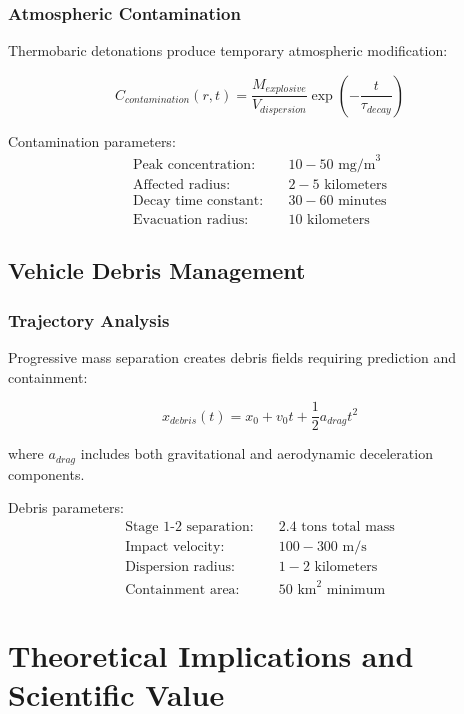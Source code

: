 \documentclass[12pt,a4paper]{article}
\begin{document}
\subsubsection{Atmospheric Contamination}
Thermobaric detonations produce temporary atmospheric modification:

\begin{equation}
C_{contamination}(r,t) = \frac{M_{explosive}}{V_{dispersion}} \exp\left(-\frac{t}{\tau_{decay}}\right)
\label{eq:contamination_decay}
\end{equation}

Contamination parameters:
\begin{align}
\text{Peak concentration:} &\quad 10-50 \text{ mg/m}^3 \\
\text{Affected radius:} &\quad 2-5 \text{ kilometers} \\
\text{Decay time constant:} &\quad 30-60 \text{ minutes} \\
\text{Evacuation radius:} &\quad 10 \text{ kilometers}
\end{align}

\subsection{Vehicle Debris Management}

\subsubsection{Trajectory Analysis}
Progressive mass separation creates debris fields requiring prediction and containment:

\begin{equation}
x_{debris}(t) = x_0 + v_0 t + \frac{1}{2}a_{drag} t^2
\label{eq:debris_trajectory}
\end{equation}

where $a_{drag}$ includes both gravitational and aerodynamic deceleration components.

Debris parameters:
\begin{align}
\text{Stage 1-2 separation:} &\quad 2.4 \text{ tons total mass} \\
\text{Impact velocity:} &\quad 100-300 \text{ m/s} \\
\text{Dispersion radius:} &\quad 1-2 \text{ kilometers} \\
\text{Containment area:} &\quad 50 \text{ km}^2 \text{ minimum}
\end{align}

\section{Theoretical Implications and Scientific Value}
\end{document}
